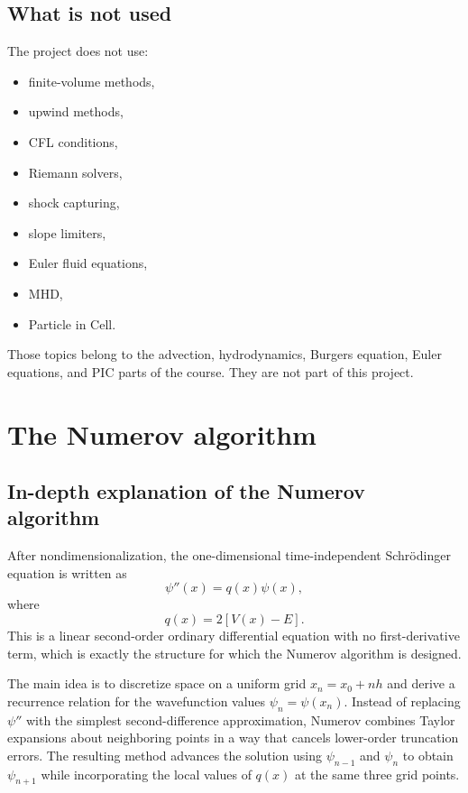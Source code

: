\documentclass[11pt]{article}
\begin{document}
    \subsection{What is not used}

    The project does not use:
    \begin{itemize}
        \item finite-volume methods,
        \item upwind methods,
        \item CFL conditions,
        \item Riemann solvers,
        \item shock capturing,
        \item slope limiters,
        \item Euler fluid equations,
        \item MHD,
        \item Particle in Cell.
    \end{itemize}

    Those topics belong to the advection, hydrodynamics, Burgers equation, Euler equations, and PIC parts of the course. They are not part of this project.

    \section{The Numerov algorithm}

    \subsection{In-depth explanation of the Numerov algorithm}

    After nondimensionalization, the one-dimensional time-independent Schr\"odinger equation is written as
    \begin{equation}
        \psi''(x)=q(x)\psi(x),
    \end{equation}
    where
    \begin{equation}
        q(x)=2[V(x)-E].
    \end{equation}
    This is a linear second-order ordinary differential equation with no first-derivative term, which is exactly the structure for which the Numerov algorithm is designed.

    The main idea is to discretize space on a uniform grid $x_n=x_0+nh$ and derive a recurrence relation for the wavefunction values $\psi_n=\psi(x_n)$. Instead of replacing $\psi''$ with the simplest second-difference approximation, Numerov combines Taylor expansions about neighboring points in a way that cancels lower-order truncation errors. The resulting method advances the solution using $\psi_{n-1}$ and $\psi_n$ to obtain $\psi_{n+1}$ while incorporating the local values of $q(x)$ at the same three grid points.
\end{document}
